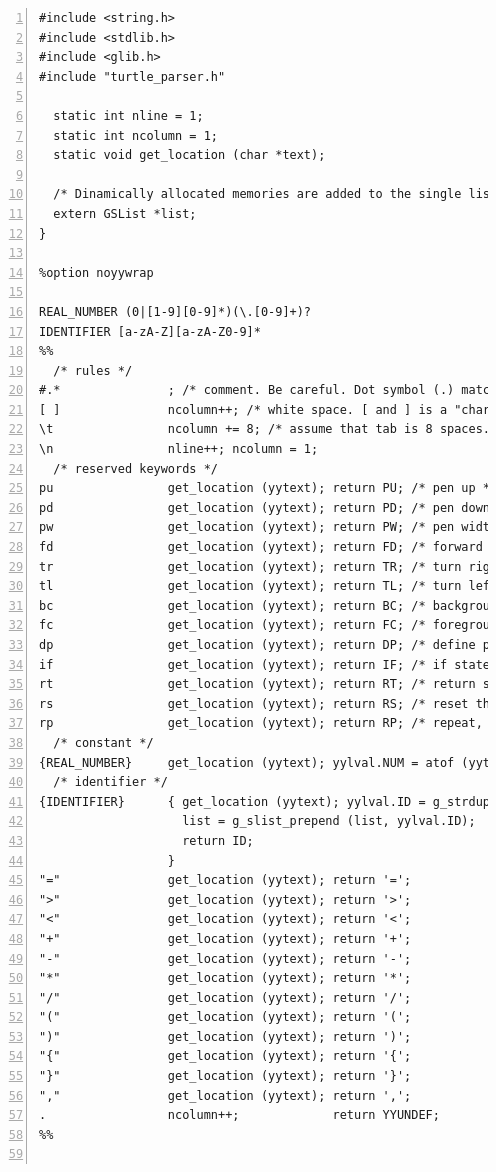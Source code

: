 \begin{lstlisting}[numbers=left]
%top{
#include <string.h>
#include <stdlib.h>
#include <glib.h>
#include "turtle_parser.h"

  static int nline = 1;
  static int ncolumn = 1;
  static void get_location (char *text);

  /* Dinamically allocated memories are added to the single list. They will be freed in the finalize function. */
  extern GSList *list;
}

%option noyywrap

REAL_NUMBER (0|[1-9][0-9]*)(\.[0-9]+)?
IDENTIFIER [a-zA-Z][a-zA-Z0-9]*
%%
  /* rules */
#.*               ; /* comment. Be careful. Dot symbol (.) matches any character but new line. */
[ ]               ncolumn++; /* white space. [ and ] is a "character class". */
\t                ncolumn += 8; /* assume that tab is 8 spaces. */
\n                nline++; ncolumn = 1;
  /* reserved keywords */
pu                get_location (yytext); return PU; /* pen up */
pd                get_location (yytext); return PD; /* pen down */
pw                get_location (yytext); return PW; /* pen width = line width */
fd                get_location (yytext); return FD; /* forward */
tr                get_location (yytext); return TR; /* turn right */
tl                get_location (yytext); return TL; /* turn left, since ver 0.5 */
bc                get_location (yytext); return BC; /* background color */
fc                get_location (yytext); return FC; /* foreground color */
dp                get_location (yytext); return DP; /* define procedure */
if                get_location (yytext); return IF; /* if statement */
rt                get_location (yytext); return RT; /* return statement */
rs                get_location (yytext); return RS; /* reset the status */
rp                get_location (yytext); return RP; /* repeat, since ver 0.5 */
  /* constant */
{REAL_NUMBER}     get_location (yytext); yylval.NUM = atof (yytext); return NUM;
  /* identifier */
{IDENTIFIER}      { get_location (yytext); yylval.ID = g_strdup(yytext);
                    list = g_slist_prepend (list, yylval.ID);
                    return ID;
                  }
"="               get_location (yytext); return '=';
">"               get_location (yytext); return '>';
"<"               get_location (yytext); return '<';
"+"               get_location (yytext); return '+';
"-"               get_location (yytext); return '-';
"*"               get_location (yytext); return '*';
"/"               get_location (yytext); return '/';
"("               get_location (yytext); return '(';
")"               get_location (yytext); return ')';
"{"               get_location (yytext); return '{';
"}"               get_location (yytext); return '}';
","               get_location (yytext); return ',';
.                 ncolumn++;             return YYUNDEF;
%%


\end{lstlisting}
